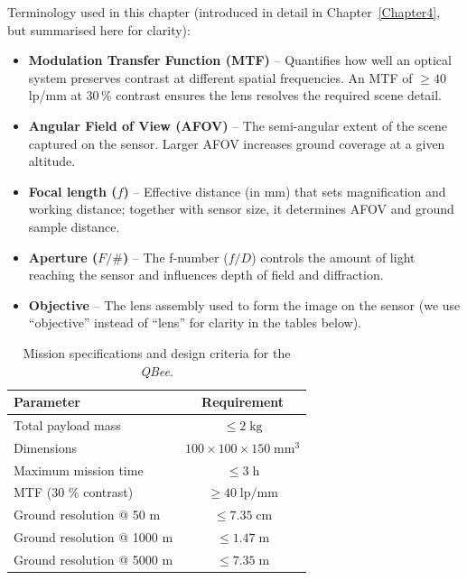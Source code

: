 \noindent Terminology used in this chapter (introduced in detail in Chapter~\ref{Chapter4}, but summarised here for clarity):
\begin{itemize}
  \item \textbf{Modulation Transfer Function (MTF)} – Quantifies how well an optical system preserves contrast at different spatial frequencies. An MTF of $\ge 40$\,lp/mm at 30\,\% contrast ensures the lens resolves the required scene detail.
  \item \textbf{Angular Field of View (AFOV)} – The semi-angular extent of the scene captured on the sensor. Larger AFOV increases ground coverage at a given altitude.
  \item \textbf{Focal length ($f$)} – Effective distance (in mm) that sets magnification and working distance; together with sensor size, it determines AFOV and ground sample distance.
  \item \textbf{Aperture ($F/\#$)} – The f-number ($f/D$) controls the amount of light reaching the sensor and influences depth of field and diffraction.
  \item \textbf{Objective} – The lens assembly used to form the image on the sensor (we use “objective” instead of “lens” for clarity in the tables below).
\end{itemize}

\begin{table}[h]
  \centering
  \caption{Mission specifications and design criteria for the
           \textit{QBee}.}
  \label{tab:req_vs_obj}
  \begin{tabular}{|p{4cm}|c|}
      \hline
      \rowcolor[HTML]{EFEFEF}\textbf{Parameter} & \textbf{Requirement} \\ \hline
      Total payload mass & $\le 2\;\text{kg}$ \\ \hline
      Dimensions & $100 \times 100 \times 150\;\text{mm}^{3}$ \\ \hline
      Maximum mission time & $\le 3\;\text{h}$ \\ \hline
      MTF (30 \% contrast) & $\ge 40\;\text{lp/mm}$ \\ \hline
      Ground resolution @ 50 m & $\le 7.35\;\text{cm}$ \\ \hline
      Ground resolution @ 1000 m & $\le 1.47\;\text{m}$ \\ \hline
      Ground resolution @ 5000 m & $\le 7.35\;\text{m}$ \\ \hline
  \end{tabular}
\end{table}

